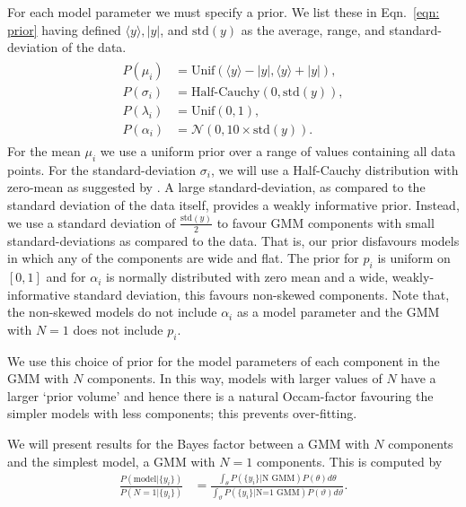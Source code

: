 \documentclass[../full_thesis/full_thesis.tex]{subfiles}
\begin{document}
\begin{subappendices}
\newcommand{\yave}{\langle y \rangle}
\newcommand{\yran}{| y |}
\newcommand{\ystd}{\textrm{std}(y)}
For each model parameter we must specify a prior. We list these in
Eqn.~\eqref{eqn: prior} having defined $\yave, \yran$, and $\ystd$ as the average,
range, and standard-deviation of the data.
\begin{align}
\begin{split}
P(\mu_i) & = \textrm{Unif}(\yave - \yran, \yave + \yran), \\
P(\sigma_i)  &= \textrm{Half-Cauchy}\left(0, \ystd\right), \\
P(\lambda_i)  &= \textrm{Unif}(0, 1), \\
P(\alpha_i)  &= \mathcal{N}(0, 10\times\ystd).
\end{split}
\label{eqn: prior}
\end{align}
For the mean $\mu_i$ we use a uniform prior over a range of values containing
all data points.
For the standard-deviation $\sigma_i$, we will use a Half-Cauchy distribution
with zero-mean as suggested by \citet{gelman2006prior}. A large standard-deviation,
as compared to the standard deviation of the data itself, provides a weakly
informative prior. Instead, we use a standard deviation of
$\frac{\ystd}{2}$ to favour GMM components with small
standard-deviations as compared to the data. That is, our prior disfavours
models in which any of the components are wide and flat. The prior for $p_i$
is uniform on $[0, 1]$ and for $\alpha_i$ is normally distributed with zero
mean and a wide, weakly-informative standard deviation, this favours non-skewed
components. Note that, the non-skewed models do not include $\alpha_i$ as
a model parameter and the GMM with $N=1$ does not include $p_i$.

We use this choice of prior for the model parameters of each component in the
GMM with $N$ components.  In this way, models with larger values of $N$ have a
larger `prior volume' and hence there is a natural Occam-factor favouring the
simpler models with less components; this prevents over-fitting.

We will present results for the Bayes factor between a GMM with $N$ components
and the simplest model, a GMM with $N=1$  components. This is computed by
\begin{align}
\frac{P(\textrm{model}| \{y_i\})}{P(N=1|\{y_i\})} & =
\frac{\int_{\theta}P(\{y_i\}| \textrm{N GMM}) P(\theta) d\theta}
{\int_{\vartheta}P(\{y_i\} | \textrm{N=1 GMM}) P(\vartheta) d\vartheta}.
\end{align}


\end{subappendices}
\end{document}
